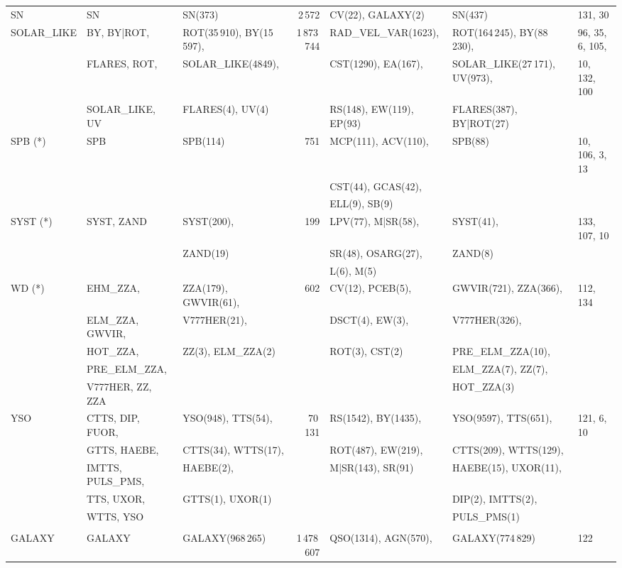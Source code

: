 \documentclass[longauth]{aa}
\begin{document}
\begin{landscape}
\begin{table}
\begin{tabular}{@{}lllrlll@{}}
SN & SN & SN(373) & 2\,572 & CV(22), GALAXY(2) & SN(437) & 131, 30  \\
SOLAR\_LIKE & BY, BY|ROT, & ROT(35\,910), BY(15\,597), & 1\,873\,744 & RAD\_VEL\_VAR(1623), & ROT(164\,245), BY(88\,230), & 96, 35, 6, 105,  \\
            & FLARES, ROT, & SOLAR\_LIKE(4849), &  & CST(1290), EA(167), & SOLAR\_LIKE(27\,171), UV(973), & 10, 132, 100  \\
            & SOLAR\_LIKE, UV & FLARES(4), UV(4) &  & RS(148), EW(119), EP(93) & FLARES(387), BY|ROT(27) &   \\
SPB (*) & SPB & SPB(114)  & 751 & MCP(111), ACV(110), & SPB(88) & 10, 106, 3, 13  \\
        &     &           &  & CST(44), GCAS(42), &  &   \\
        &     &           &  & ELL(9), SB(9) &  &   \\
SYST (*) & SYST, ZAND & SYST(200),  & 199 & LPV(77), M|SR(58), & SYST(41), & 133, 107, 10  \\
         &            & ZAND(19)    &  & SR(48), OSARG(27), & ZAND(8) &   \\
         &            &             &  & L(6), M(5) &  &   \\
WD (*) & EHM\_ZZA, & ZZA(179), GWVIR(61), & 602 & CV(12), PCEB(5), & GWVIR(721), ZZA(366), & 112, 134 \\
   & ELM\_ZZA, GWVIR, & V777HER(21), &  & DSCT(4), EW(3), & V777HER(326), &   \\
   & HOT\_ZZA, & ZZ(3), ELM\_ZZA(2) &  & ROT(3), CST(2) & PRE\_ELM\_ZZA(10), &   \\
   & PRE\_ELM\_ZZA, &  &  &  & ELM\_ZZA(7), ZZ(7),  &   \\
   & V777HER, ZZ, ZZA &  &  &  & HOT\_ZZA(3)  &   \\
YSO & CTTS, DIP, FUOR,  & YSO(948), TTS(54), & 70\,131 & RS(1542), BY(1435), & YSO(9597), TTS(651), & 121, 6, 10  \\
    & GTTS, HAEBE, & CTTS(34),  WTTS(17), &  & ROT(487), EW(219), & CTTS(209), WTTS(129), &   \\
    & IMTTS, PULS\_PMS,& HAEBE(2),  &  & M|SR(143), SR(91) & HAEBE(15), UXOR(11), &   \\
    &  TTS,  UXOR, & GTTS(1), UXOR(1) &  &  & DIP(2), IMTTS(2),  &   \\
    & WTTS, YSO &  &  &  & PULS\_PMS(1) &   \\
\hline & \\[-2ex]
GALAXY & GALAXY & GALAXY(968\,265) & 1\,478\,607 & QSO(1314), AGN(570), & GALAXY(774\,829) & 122  \\

\end{tabular}
\end{table}
\end{landscape}
\end{document}
